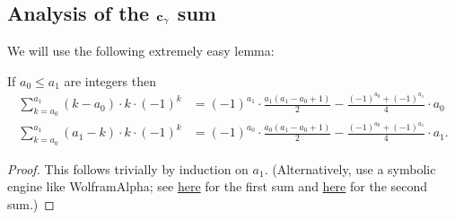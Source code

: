 \subsection{Analysis of the $\mathbf c_\gamma$ sum}
We will use the following extremely easy lemma:
\begin{lemma}
  \label{lem:extremely_easy_lemma}
  If $a_0 \le a_1$ are integers then
  \begin{align*}
    \sum_{k=a_0}^{a_1} (k-a_0) \cdot k \cdot (-1)^k
    &= (-1)^{a_1} \cdot \frac{a_1(a_1-a_0+1)}{2} - \frac{(-1)^{a_0} + (-1)^{a_1}}{4} \cdot a_0 \\
    \sum_{k=a_0}^{a_1} (a_1-k) \cdot k \cdot (-1)^k
    &= (-1)^{a_0} \cdot \frac{a_0(a_1-a_0+1)}{2} - \frac{(-1)^{a_0} + (-1)^{a_1}}{4} \cdot a_1.
  \end{align*}
\end{lemma}
\begin{proof}
  This follows trivially by induction on $a_1$.
  (Alternatively, use a symbolic engine like WolframAlpha;
  see
  \href{https://www.wolframalpha.com/input?i=sum+\%28k-a\%29*k*\%28-1\%29\%5Ek+from+k\%3Da+to+b}{here}
  for the first sum and
  \href{https://www.wolframalpha.com/input?i=sum+\%28b-k\%29*k*\%28-1\%29\%5Ek+from+k\%3Da+to+b}{here}
  for the second sum.)
\end{proof}


